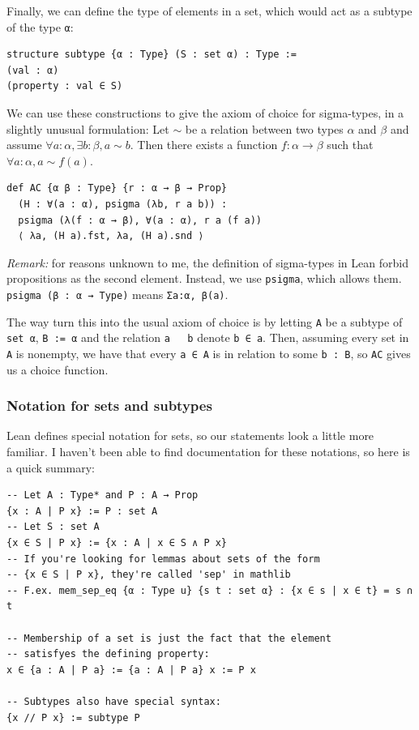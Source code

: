 \documentclass[a4paper, 12pt]{article}
\newcommand{\lean}[1]{\texttt{#1}}
\theoremstyle{changedot}
\theoremstyle{changedotbreak}
\theoremstyle{nonumberplain}
\begin{document}
Finally, we can define the type of elements in a set, which would act as a subtype of the type \lean{α}:

\begin{verbatim}
structure subtype {α : Type} (S : set α) : Type :=
(val : α)
(property : val ∈ S)
\end{verbatim}

We can use these constructions to give the axiom of choice for sigma-types, in a slightly unusual formulation: Let $\sim$ be a relation between two types $\alpha$ and $\beta$ and assume $\forall a : \alpha, \exists b : \beta, a \sim b$. Then there exists a function $f : \alpha \to \beta$ such that $\forall a : \alpha, a \sim f(a)$.

\begin{verbatim}
def AC {α β : Type} {r : α → β → Prop}
  (H : ∀(a : α), psigma (λb, r a b)) :
  psigma (λ(f : α → β), ∀(a : α), r a (f a))
  ⟨ λa, (H a).fst, λa, (H a).snd ⟩
\end{verbatim}
\textit{Remark:} for reasons unknown to me, the definition of sigma-types in Lean forbid propositions as the second element. Instead, we use \lean{psigma}, which allows them. \lean{psigma (β : α → Type)} means \lean{Σa:α, β(a)}.

The way turn this into the usual axiom of choice is by letting \lean{A} be a subtype of \lean{set α}, \lean{B := α} and the relation \lean{a ~ b} denote \lean{b ∈ a}. Then, assuming every set in \lean{A} is nonempty, we have that every \lean{a ∈ A} is in relation to some \lean{b : B}, so \lean{AC} gives us a choice function.

\subsubsection{Notation for sets and subtypes}
Lean defines special notation for sets, so our statements look a little more familiar. I haven't been able to find documentation for these notations, so here is a quick summary:

\begin{verbatim}
-- Let A : Type* and P : A → Prop
{x : A | P x} := P : set A
-- Let S : set A
{x ∈ S | P x} := {x : A | x ∈ S ∧ P x}
-- If you're looking for lemmas about sets of the form
-- {x ∈ S | P x}, they're called 'sep' in mathlib
-- F.ex. mem_sep_eq {α : Type u} {s t : set α} : {x ∈ s | x ∈ t} = s ∩ t

-- Membership of a set is just the fact that the element
-- satisfyes the defining property:
x ∈ {a : A | P a} := {a : A | P a} x := P x

-- Subtypes also have special syntax:
{x // P x} := subtype P
\end{verbatim}
\end{document}
